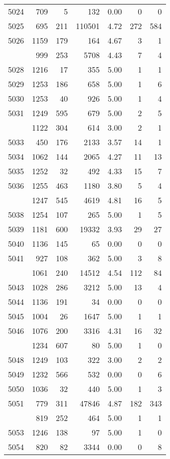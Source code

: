\documentclass[
]{article}
\begin{document}
\begin{table}
\begin{tabular}[t]{lrrrrrr}
5024 & 709 & 5 & 132 & 0.00 & 0 & 0\\
5025 & 695 & 211 & 110501 & 4.72 & 272 & 584\\
5026 & 1159 & 179 & 164 & 4.67 & 3 & 1\\
\addlinespace
5027 & 999 & 253 & 5708 & 4.43 & 7 & 4\\
5028 & 1216 & 17 & 355 & 5.00 & 1 & 1\\
5029 & 1253 & 186 & 658 & 5.00 & 1 & 6\\
5030 & 1253 & 40 & 926 & 5.00 & 1 & 4\\
5031 & 1249 & 595 & 679 & 5.00 & 2 & 5\\
\addlinespace
5032 & 1122 & 304 & 614 & 3.00 & 2 & 1\\
5033 & 450 & 176 & 2133 & 3.57 & 14 & 1\\
5034 & 1062 & 144 & 2065 & 4.27 & 11 & 13\\
5035 & 1252 & 32 & 492 & 4.33 & 15 & 7\\
5036 & 1255 & 463 & 1180 & 3.80 & 5 & 4\\
\addlinespace
5037 & 1247 & 545 & 4619 & 4.81 & 16 & 5\\
5038 & 1254 & 107 & 265 & 5.00 & 1 & 5\\
5039 & 1181 & 600 & 19332 & 3.93 & 29 & 27\\
5040 & 1136 & 145 & 65 & 0.00 & 0 & 0\\
5041 & 927 & 108 & 362 & 5.00 & 3 & 8\\
\addlinespace
5042 & 1061 & 240 & 14512 & 4.54 & 112 & 84\\
5043 & 1028 & 286 & 3212 & 5.00 & 13 & 4\\
5044 & 1136 & 191 & 34 & 0.00 & 0 & 0\\
5045 & 1004 & 26 & 1647 & 5.00 & 1 & 1\\
5046 & 1076 & 200 & 3316 & 4.31 & 16 & 32\\
\addlinespace
5047 & 1234 & 607 & 80 & 5.00 & 1 & 0\\
5048 & 1249 & 103 & 322 & 3.00 & 2 & 2\\
5049 & 1232 & 566 & 532 & 0.00 & 0 & 6\\
5050 & 1036 & 32 & 440 & 5.00 & 1 & 3\\
5051 & 779 & 311 & 47846 & 4.87 & 182 & 343\\
\addlinespace
5052 & 819 & 252 & 464 & 5.00 & 1 & 1\\
5053 & 1246 & 138 & 97 & 5.00 & 1 & 0\\
5054 & 820 & 82 & 3344 & 0.00 & 0 & 8\\

\end{tabular}
\end{table}
\end{document}
